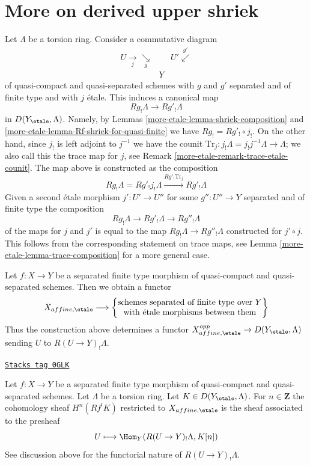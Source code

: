 \section{More on derived upper shriek}
\label{more-etale-section-more-derived-upper-shriek}
Let $\Lambda$ be a torsion ring. Consider a commutative diagram
$$
\begin{array}{ccc}U \underset{j}{\longrightarrow}\underset{g}{\searrow} &  & U' \overset{g'}{\swarrow} \\  & Y & \end{array}
$$
of quasi-compact and quasi-separated schemes with $g$ and $g'$
separated and of finite type and with $j$ \'etale. This induces
a canonical map
$$
Rg_!\Lambda \longrightarrow Rg'_!\Lambda
$$
in $D(Y_\etale, \Lambda)$. Namely, by Lemmas \ref{more-etale-lemma-shriek-composition}
and \ref{more-etale-lemma-Rf-shriek-for-quasi-finite} we have $Rg_! = Rg'_! \circ j_!$.
On the other hand, since $j_!$ is left adjoint to $j^{-1}$ we have
the counit $\text{Tr}_j : j_!\Lambda = j_!j^{-1}\Lambda \to \Lambda$;
we also call this the trace map for $j$, see
Remark \ref{more-etale-remark-trace-etale-counit}.
The map above is constructed as the composition
$$
Rg_!\Lambda = Rg'_!j_!\Lambda
\xrightarrow{Rg'_! \text{Tr}_j}
Rg'_!\Lambda
$$
Given a second \'etale morphism $j' : U' \to U''$
for some $g'' : U'' \to Y$ separated and of finite type
the composition
$$
Rg_!\Lambda \longrightarrow Rg'_!\Lambda \longrightarrow Rg''_!\Lambda
$$
of the maps for $j$ and $j'$ is equal to the map
$Rg_!\Lambda \longrightarrow Rg''_!\Lambda$ constructed for $j' \circ j$.
This follows from the corresponding statement on trace maps,
see Lemma \ref{more-etale-lemma-trace-composition} for a more general case.

\medskip\noindent
Let $f : X \to Y$ be a separated finite type morphism of quasi-compact
and quasi-separated schemes. Then we obtain a functor
$$
X_{affine, \etale}
\longrightarrow
\left\{
\begin{matrix}
\text{schemes separated of finite type over }Y\\
\text{with \'etale morphisms between them}
\end{matrix}
\right\}
$$
Thus the construction above determines a functor
$X_{affine, \etale}^{opp} \to D(Y_\etale, \Lambda)$
sending $U$ to $R(U \to Y)_!\Lambda$.

\begin{lemma}
\label{more-etale-lemma-describe-Rf-upper-shriek}
\href{https://stacks.math.columbia.edu/tag/0GLK}{\texttt{Stacks tag 0GLK}}

Let $f : X \to Y$ be a separated finite type morphism of quasi-compact
and quasi-separated schemes. Let $\Lambda$ be a torsion ring.
Let $K \in D(Y_\etale, \Lambda)$. For $n \in \mathbf{Z}$ the
cohomology sheaf $H^n(Rf^!K)$ restricted to $X_{affine, \etale}$
is the sheaf associated to the presheaf
$$
U \longmapsto \Hom_Y(R(U \to Y)_!\Lambda, K[n])
$$
See discussion above for the functorial nature of $R(U \to Y)_!\Lambda$.
\end{lemma}

